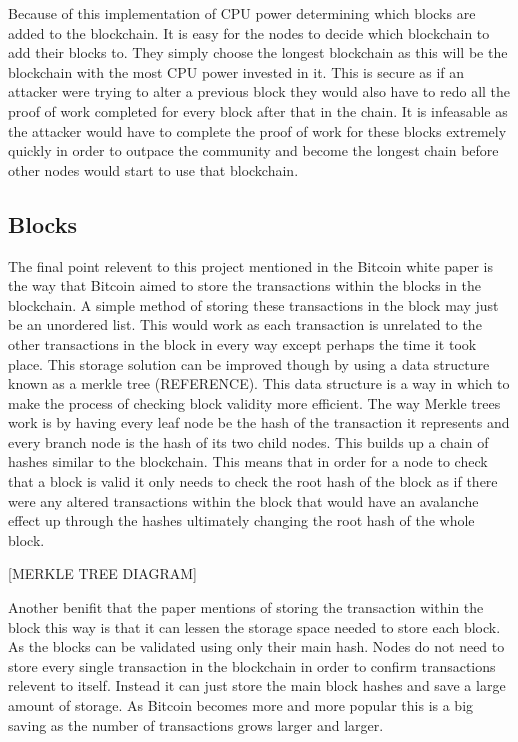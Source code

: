 \documentclass{l4proj}
\begin{document}
Because of this implementation of CPU power determining which blocks are added to the blockchain. It is easy for the
nodes to decide which blockchain to add their blocks to. They simply choose the longest blockchain as this will be
the blockchain with the most CPU power invested in it. This is secure as if an attacker were trying to alter a 
previous block they would also have to redo all the proof of work completed for every block after that in the chain.
It is infeasable as the attacker would have to complete the proof of work for these blocks extremely quickly in order
to outpace the community and become the longest chain before other nodes would start to use that blockchain.


\subsection{Blocks}
The final point relevent to this project mentioned in the Bitcoin white paper is the way that Bitcoin aimed to store
the transactions within the blocks in the blockchain. A simple method of storing these transactions in the block may
just be an unordered list. This would work as each transaction is unrelated to the other transactions in the block in
every way except perhaps the time it took place. This storage solution can be improved though by using a data structure
known as a merkle tree (REFERENCE). This data structure is a way in which to make the process of checking block validity
more efficient. The way Merkle trees work is by having every leaf node be the hash of the transaction it represents 
and every branch node is the hash of its two child nodes. This builds up a chain of hashes similar to the blockchain.
This means that in order for a node to check that a block is valid it only needs to check the root hash of the block as
if there were any altered transactions within the block that would have an avalanche effect up through the hashes
ultimately changing the root hash of the whole block.

[MERKLE TREE DIAGRAM]

Another benifit that the paper mentions of storing the transaction within the block this way is that it can lessen
the storage space needed to store each block. As the blocks can be validated using only their main hash. Nodes do 
not need to store every single transaction in the blockchain in order to confirm transactions relevent to itself.
Instead it can just store the main block hashes and save a large amount of storage. As Bitcoin becomes more and
more popular this is a big saving as the number of transactions grows larger and larger.
\end{document}
